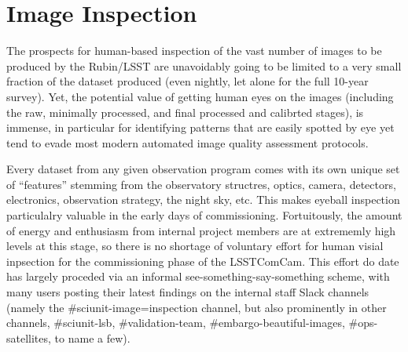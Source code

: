 \section{Image Inspection}
\label{sec:image_inspection}

The prospects for human-based inspection of the vast number of images to be
produced by the Rubin/LSST are unavoidably going to be limited to a very small
fraction of the dataset produced (even nightly, let alone for the full 10-year
survey).  Yet, the potential value of getting human eyes on the images (including
the raw, minimally processed, and final processed and calibrted stages), is
immense, in particular for identifying patterns that are easily spotted by eye
yet tend to evade most modern automated image quality assessment protocols.

Every dataset from any given observation program comes with its own unique set
of ``features'' stemming from the observatory structres, optics, camera,
detectors, electronics, observation strategy, the night sky, etc.  This makes
eyeball inspection particulalry valuable in the early days of commissioning.
Fortuitously, the amount of energy and enthusiasm from internal project members
are at extrememly high levels at this stage, so there is no shortage of voluntary
effort for human visial inpsection for the commissioning phase of the LSSTComCam.
This effort do date has largely proceded via an informal
see-something-say-something scheme, with many users posting their latest findings
on the internal staff Slack channels (namely the \#sciunit-image=inspection channel,
but also prominently in other channels, \#sciunit-lsb, \#validation-team,
\#embargo-beautiful-images, \#ops-satellites, to name a few).


